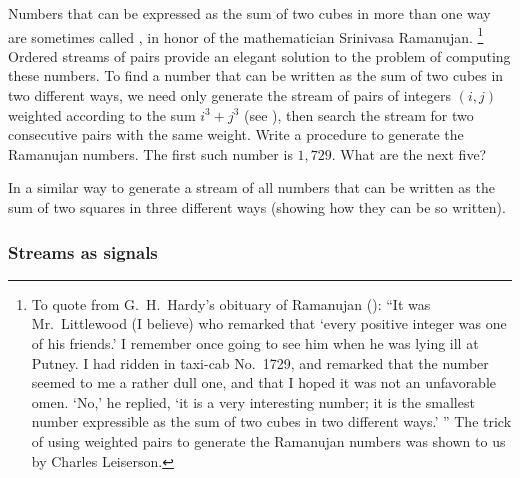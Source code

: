 \begin{exercise}
	\label{Exercise 3.71}
	Numbers that can be expressed as the sum of two cubes in more than one way are sometimes called , in honor of the mathematician Srinivasa Ramanujan.%
	\footnote{
		To quote from G.~H.~Hardy’s obituary of Ramanujan ():
		“It was Mr.~Littlewood (I believe) who remarked that ‘every positive integer was one of his friends.’  I remember once going to see him when he was lying ill at Putney.
		I had ridden in taxi-cab No.~1729, and remarked that the number seemed to me a rather dull one, and that I hoped it was not an unfavorable omen.
		‘No,’ he replied, ‘it is a very interesting number;
		it is the smallest number expressible as the sum of two cubes in two different ways.’ ”
		The trick of using weighted pairs to generate the Ramanujan numbers was shown to us by Charles Leiserson.
	}
	Ordered streams of pairs provide an elegant solution to the problem of computing these numbers.
	To find a number that can be written as the sum of two cubes in two different ways, we need only generate the stream of pairs of integers \( (i, j) \) weighted according to the sum \( i^3 + j^3 \) (see ), then search the stream for two consecutive pairs with the same weight.
	Write a procedure to generate the Ramanujan numbers.
	The first such number is \( 1,729 \).
	What are the next five?
\end{exercise}



\begin{exercise}
	\label{Exercise 3.72}
	In a similar way to  generate a stream of all numbers that can be written as the sum of two squares in three different ways (showing how they can be so written).
\end{exercise}



\subsubsection*{Streams as signals}

